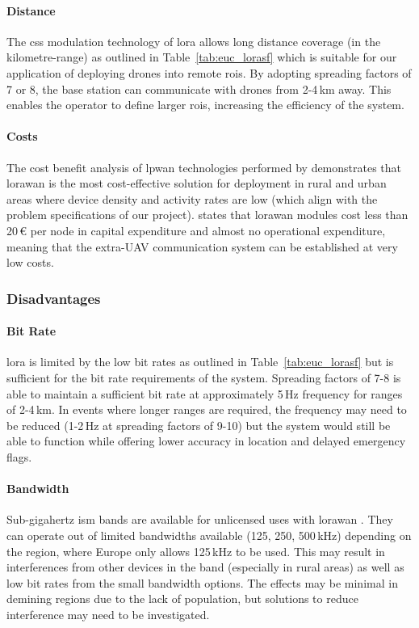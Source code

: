 \paragraph{Distance} The \gls{css} modulation technology of \gls{lora} allows long distance coverage (in the kilometre-range) as outlined in Table~\ref{tab:euc_lorasf} which is suitable for our application of deploying drones into remote \gls{roi}s. By adopting spreading factors of 7 or 8, the base station can communicate with drones from 2-4\,km away. This enables the operator to define larger \gls{roi}s, increasing the efficiency of the system. 

\paragraph{Costs} The cost benefit analysis of \gls{lpwan} technologies performed by \cite{hossain2021lpwancosts} demonstrates that \gls{lorawan} is the most cost-effective solution for deployment in rural and urban areas where device density and activity rates are low (which align with the problem specifications of our project). \cite{stokking2021lorawan} states that \gls{lorawan} modules cost less than 20\,€ per node in capital expenditure and almost no operational expenditure, meaning that the extra-\gls{UAV} communication system can be established at very low costs.
 
\subsubsection{Disadvantages}

\paragraph{Bit Rate} \gls{lora} is limited by the low bit rates as outlined in Table~\ref{tab:euc_lorasf} but is sufficient for the bit rate requirements of the system. Spreading factors of 7-8 is able to maintain a sufficient bit rate at approximately 5\,Hz frequency for ranges of 2-4\,km. In events where longer ranges are required, the frequency may need to be reduced (1-2\,Hz at spreading factors of 9-10) but the system would still be able to function while offering lower accuracy in location and delayed emergency flags. 

\paragraph{Bandwidth} Sub-gigahertz \gls{ism} bands are available for unlicensed uses with \gls{lorawan} \cite{stokking2021lorawan}. They can operate out of limited bandwidths available (125, 250, 500\,kHz) depending on the region, where Europe only allows 125\,kHz to be used. This may result in interferences from other devices in the band (especially in rural areas) as well as low bit rates from the small bandwidth options. The effects may be minimal in demining regions due to the lack of population, but solutions to reduce interference may need to be investigated. 

